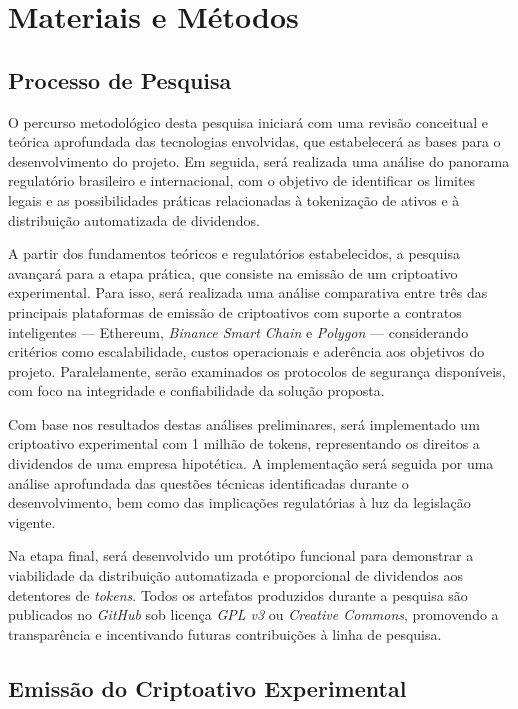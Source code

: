 \documentclass[12pt, a4paper, oneside, openright, chapter=TITLE]{abntex2}
\begin{document}
\section{Materiais e Métodos}
\subsection{Processo de Pesquisa}
\hspace*{\parindent} O percurso metodológico desta pesquisa iniciará com uma revisão conceitual e teórica aprofundada das tecnologias envolvidas, que estabelecerá as bases para o desenvolvimento do projeto. Em seguida, será realizada uma análise do panorama regulatório brasileiro e internacional,  com o objetivo de identificar os limites legais e as possibilidades práticas relacionadas à tokenização de ativos e à distribuição automatizada de dividendos.

A partir dos fundamentos teóricos e regulatórios estabelecidos, a pesquisa avançará para a etapa prática, que consiste na emissão de um criptoativo experimental. Para isso, será realizada uma análise comparativa entre três das principais plataformas de emissão de criptoativos com suporte a contratos inteligentes — Ethereum, \textit{Binance Smart Chain} e \textit{Polygon} — considerando critérios como escalabilidade, custos operacionais e aderência aos objetivos do projeto. Paralelamente, serão examinados os protocolos de segurança disponíveis, com foco na integridade e confiabilidade da solução proposta.

Com base nos resultados destas análises preliminares, será implementado um criptoativo experimental com 1 milhão de tokens, representando os direitos a dividendos de uma empresa hipotética. A implementação será seguida por uma análise aprofundada das questões técnicas identificadas durante o desenvolvimento, bem como das implicações regulatórias à luz da legislação vigente.

Na etapa final, será desenvolvido um protótipo funcional para demonstrar a viabilidade da distribuição automatizada e proporcional de dividendos aos detentores de \textit{tokens}. Todos os artefatos produzidos durante a pesquisa são publicados no \textit{GitHub} sob licença \textit{GPL v3} ou \textit{Creative Commons}, promovendo a transparência e incentivando futuras contribuições à linha de pesquisa.

\subsection{Emissão do Criptoativo Experimental}
\end{document}
